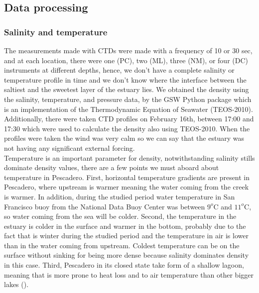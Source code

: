 \documentclass[11pt,letterpaper]{article}
\begin{document}
\subsection{Data processing}

\subsubsection{Salinity and temperature}

The measurements made with CTDs were made with a frequency of 10 or 30 sec, and at each location, there were one (PC), two (ML), three (NM), or four (DC) instruments at different depths, hence, we don’t have a complete salinity or temperature profile in time and we don’t know where the interface between the saltiest and the sweetest layer of the estuary lies. We obtained the density using the salinity, temperature, and pressure data, by the GSW Python package which is an implementation of the Thermodynamic Equation of Seawater (TEOS-2010).\\

Additionally, there were taken CTD profiles on February 16th, between 17:00 and 17:30 which were used to calculate the density also using TEOS-2010. When the profiles were taken the wind was very calm so we can say that the estuary was not having any significant external forcing. \\

Temperature is an important parameter for density, notwithstanding salinity stills dominate density values, there are a few points we must aboard about temperature in Pescadero. First, horizontal temperature gradients are present in Pescadero, where upstream is warmer meaning the water coming from the creek is warmer. In addition, during the studied period water temperature in San Francisco buoy from the National Data Buoy Center was between $9^o$C and $11^o$C, so water coming from the sea will be colder. Second, the temperature in the estuary is colder in the surface and warmer in the bottom, probably due to the fact that is winter during the studied period and the temperature in air is lower than in the water coming from upstream. Coldest temperature can be on the surface without sinking for being more dense because salinity dominates density in this case. Third, Pescadero in its closed state take form of a shallow lagoon, meaning that is more prone to heat loss and to air temperature than other bigger lakes (\cite{peeters2009currents}).\\
\end{document}
